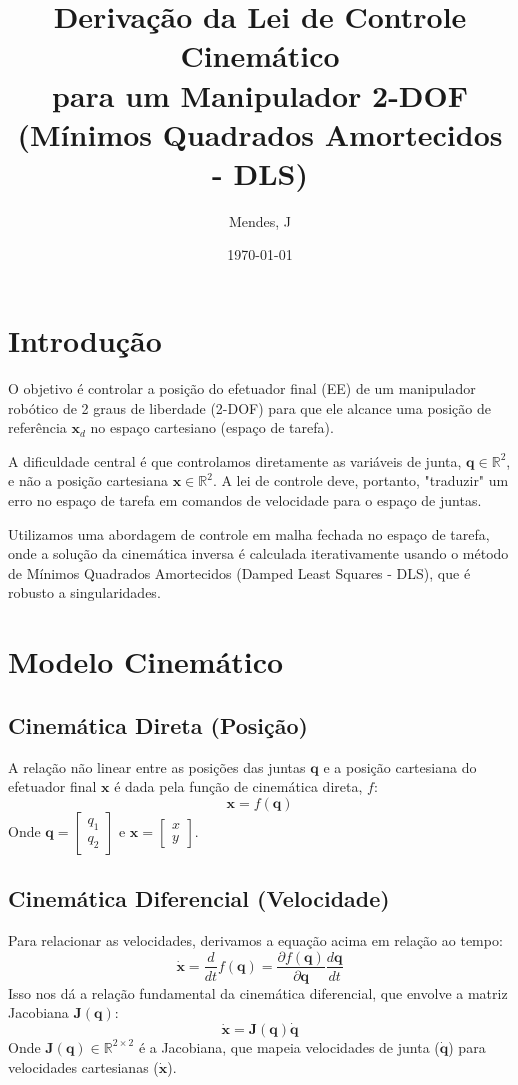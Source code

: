 \documentclass[a4paper, 12pt]{article}
\title{Derivação da Lei de Controle Cinemático \\
       para um Manipulador 2-DOF \\
       \large (Mínimos Quadrados Amortecidos - DLS)}
\author{Mendes, J}
\date{\today}
\begin{document}
\maketitle

\section{Introdução}
O objetivo é controlar a posição do efetuador final (EE) de um manipulador robótico de 2 graus de liberdade (2-DOF) para que ele alcance uma posição de referência $\mathbf{x}_d$ no espaço cartesiano (espaço de tarefa).

A dificuldade central é que controlamos diretamente as variáveis de junta, $\mathbf{q} \in \mathbb{R}^2$, e não a posição cartesiana $\mathbf{x} \in \mathbb{R}^2$. A lei de controle deve, portanto, "traduzir" um erro no espaço de tarefa em comandos de velocidade para o espaço de juntas.

Utilizamos uma abordagem de controle em malha fechada no espaço de tarefa, onde a solução da cinemática inversa é calculada iterativamente usando o método de Mínimos Quadrados Amortecidos (Damped Least Squares - DLS), que é robusto a singularidades.

\section{Modelo Cinemático}

\subsection{Cinemática Direta (Posição)}
A relação não linear entre as posições das juntas $\mathbf{q}$ e a posição cartesiana do efetuador final $\mathbf{x}$ é dada pela função de cinemática direta, $f$:
\[
\mathbf{x} = f(\mathbf{q})
\]
Onde $\mathbf{q} = \begin{bmatrix} q_1 \\ q_2 \end{bmatrix}$ e $\mathbf{x} = \begin{bmatrix} x \\ y \end{bmatrix}$.

\subsection{Cinemática Diferencial (Velocidade)}
Para relacionar as velocidades, derivamos a equação acima em relação ao tempo:
\[
\dot{\mathbf{x}} = \frac{d}{dt} f(\mathbf{q}) = \frac{\partial f(\mathbf{q})}{\partial \mathbf{q}} \frac{d\mathbf{q}}{dt}
\]
Isso nos dá a relação fundamental da cinemática diferencial, que envolve a matriz Jacobiana $\mathbf{J}(\mathbf{q})$:
\begin{equation}
\dot{\mathbf{x}} = \mathbf{J}(\mathbf{q}) \dot{\mathbf{q}}
\label{eq:jacobiana}
\end{equation}
Onde $\mathbf{J}(\mathbf{q}) \in \mathbb{R}^{2 \times 2}$ é a Jacobiana, que mapeia velocidades de junta ($\dot{\mathbf{q}}$) para velocidades cartesianas ($\dot{\mathbf{x}}$).
\end{document}
